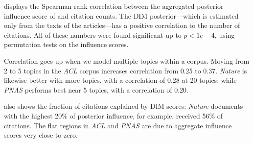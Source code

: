  displays the Spearman rank correlation between the
aggregated posterior influence score of  and citation
counts.  The DIM posterior---which is estimated only from the texts of
the articles---has a positive correlation to the number of citations.
All of these numbers were found significant up to $p<1e-4$, using
permutation tests on the influence scores.

Correlation goes up when we model multiple topics within a corpus.
Moving from 2 to 5 topics in the \emph{ACL} corpus increases
correlation from 0.25 to 0.37.  \emph{Nature} is likewise better with
more topics, with a correlation of 0.28 at 20 topics; while
\emph{PNAS} performs best near 5 topics, with a correlation of 0.20.


 also shows the fraction of citations explained
by DIM scores: \emph{Nature} documents with the highest 20\% of
posterior influence, for example, received 56\% of citations.  The
flat regions in \emph{ACL} and \emph{PNAS} are due to aggregate
influence scores very close to zero.







